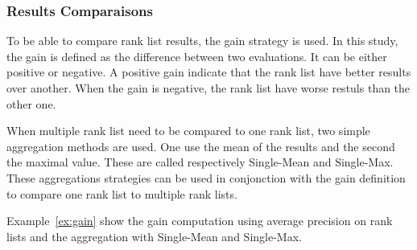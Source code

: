 \subsubsection{Results Comparaisons \label{sec:results_comparaison}}

To be able to compare rank list results, the gain strategy is used.
In this study, the gain is defined as the difference between two evaluations.
It can be either positive or negative.
A positive gain indicate that the rank list have better results over another.
When the gain is negative, the rank list have worse restuls than the other one.

When multiple rank list need to be compared to one rank list, two simple aggregation methods are used.
One use the mean of the results and the second the maximal value.
These are called respectively Single-Mean and Single-Max.
These aggregations strategies can be used in conjonction with the gain definition to compare one rank list to multiple rank lists.

Example~\ref{ex:gain} show the gain computation using average precision on rank lists and the aggregation with Single-Mean and Single-Max.

